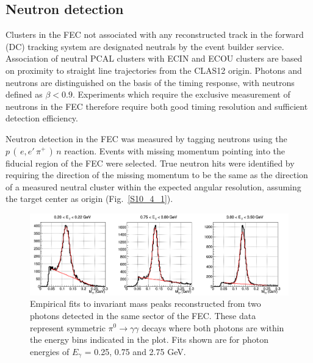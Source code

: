 \subsection{Neutron detection}
Clusters in the FEC not associated with any reconstructed track in the forward (DC) tracking system are designated neutrals by the event builder service.  Association of neutral PCAL clusters with ECIN and ECOU clusters are based on proximity to straight line trajectories from the CLAS12 origin.  Photons and neutrons are distinguished on the basis of the timing response, with neutrons defined as $\beta < 0.9$.  Experiments which require the exclusive measurement of neutrons in the FEC therefore require both good timing resolution and sufficient detection efficiency. 

Neutron detection in the FEC was measured by tagging neutrons using the $p\,(\,e,e'\,\pi^+\,)\,n$ reaction. Events with missing momentum pointing into the fiducial region of the FEC were selected.  True neutron hits were identified by requiring the direction of the missing momentum to be the same as the direction of a measured neutral cluster within the expected angular resolution, assuming the target center as origin (Fig.~\ref{S10_4_1}).  

\begin{figure}[hbt]
\centering
\includegraphics[width=1.0\columnwidth,keepaspectratio]{img/fx-pi0-fits.png}
\caption[]{Empirical fits to invariant mass peaks reconstructed from two photons detected in the same sector of the FEC.  These data represent symmetric $\pi^0 \rightarrow \gamma \gamma$ decays where both photons are within the energy bins indicated in the plot. Fits shown are for photon energies of $E_{\gamma}$ = 0.25, 0.75 and 2.75 GeV.}
\label{fig:fx-pi0-fits}
\end{figure}

